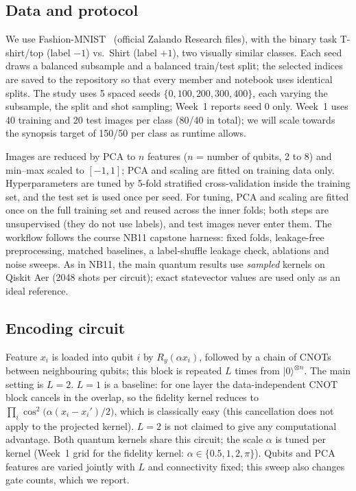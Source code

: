 \documentclass[conference]{IEEEtran}
\begin{document}
\subsection{Data and protocol}
We use Fashion-MNIST~\cite{xiao2017} (official Zalando Research files), with the binary task T-shirt/top (label $-1$) vs.\ Shirt (label $+1$), two visually similar classes. Each seed draws a balanced subsample and a balanced train/test split; the selected indices are saved to the repository so that every member and notebook uses identical splits. The study uses 5 spaced seeds $\{0,100,200,300,400\}$, each varying the subsample, the split and shot sampling; Week~1 reports seed 0 only. Week~1 uses 40 training and 20 test images per class (80/40 in total); we will scale towards the synopsis target of 150/50 per class as runtime allows.

Images are reduced by PCA to $n$ features ($n$ = number of qubits, 2 to 8) and min--max scaled to $[-1,1]$; PCA and scaling are fitted on training data only. Hyperparameters are tuned by 5-fold stratified cross-validation inside the training set, and the test set is used once per seed. For tuning, PCA and scaling are fitted once on the full training set and reused across the inner folds; both steps are unsupervised (they do not use labels), and test images never enter them. The workflow follows the course NB11 capstone harness: fixed folds, leakage-free preprocessing, matched baselines, a label-shuffle leakage check, ablations and noise sweeps. As in NB11, the main quantum results use \emph{sampled} kernels on Qiskit Aer (2048 shots per circuit); exact statevector values are used only as an ideal reference.

\subsection{Encoding circuit}
Feature $x_i$ is loaded into qubit $i$ by $R_y(\alpha x_i)$, followed by a chain of CNOTs between neighbouring qubits; this block is repeated $L$ times from $|0\rangle^{\otimes n}$. The main setting is $L=2$. $L=1$ is a baseline: for one layer the data-independent CNOT block cancels in the overlap, so the fidelity kernel reduces to $\prod_i\cos^2\!\big(\alpha(x_i-x_i')/2\big)$, which is classically easy (this cancellation does not apply to the projected kernel). $L=2$ is not claimed to give any computational advantage. Both quantum kernels share this circuit; the scale $\alpha$ is tuned per kernel (Week~1 grid for the fidelity kernel: $\alpha\in\{0.5,1,2,\pi\}$). Qubits and PCA features are varied jointly with $L$ and connectivity fixed; this sweep also changes gate counts, which we report.
\end{document}
